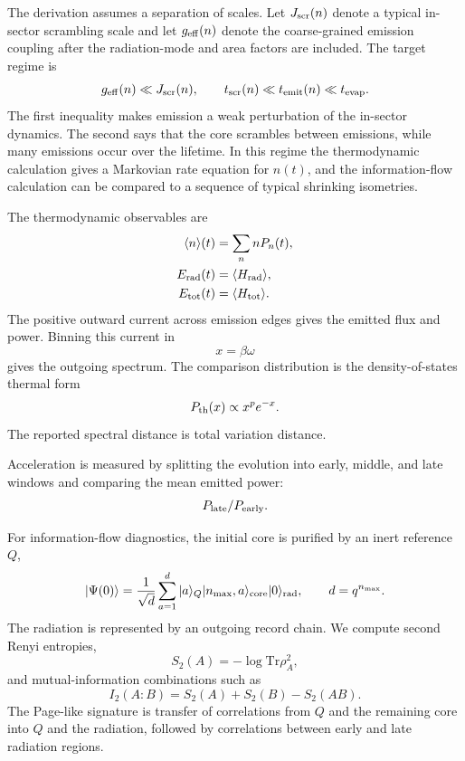 \documentclass[12pt]{article}
\newcommand{\Tr}{\mathrm{Tr}}
\newcommand{\ket}[1]{|#1\rangle}
\begin{document}
The derivation assumes a separation of scales.  Let $J_{\rm scr}(n)$ denote a
typical in-sector scrambling scale and let $g_{\rm eff}(n)$ denote the
coarse-grained emission coupling after the radiation-mode and area factors are
included.  The target regime is
\begin{equation}
    g_{\rm eff}(n)\ll J_{\rm scr}(n),
    \qquad
    t_{\rm scr}(n)\ll t_{\rm emit}(n)\ll t_{\rm evap}.
\end{equation}
The first inequality makes emission a weak perturbation of the in-sector
dynamics.  The second says that the core scrambles between emissions, while
many emissions occur over the lifetime.  In this regime the thermodynamic
calculation gives a Markovian rate equation for $n(t)$, and the
information-flow calculation can be compared to a sequence of typical
shrinking isometries.

The thermodynamic observables are
\begin{align}
    \langle n\rangle(t)&=\sum_n nP_n(t),\\
    E_{\rm rad}(t)&=\langle H_{\rm rad}\rangle,\\
    E_{\rm tot}(t)&=\langle H_{\rm tot}\rangle .
\end{align}
The positive outward current across emission edges gives the emitted flux and
power.  Binning this current in
\begin{equation}
    x=\beta\omega
\end{equation}
gives the outgoing spectrum.  The comparison distribution is the
density-of-states thermal form
\begin{equation}
    P_{\rm th}(x)\propto x^p e^{-x}.
\end{equation}
The reported spectral distance is total variation distance.

Acceleration is measured by splitting the evolution into early, middle, and
late windows and comparing the mean emitted power:
\begin{equation}
    P_{\rm late}/P_{\rm early}.
\end{equation}

For information-flow diagnostics, the initial core is purified by an inert
reference $Q$,
\begin{equation}
    \ket{\Psi(0)}
    =
    \frac{1}{\sqrt d}\sum_{a=1}^{d}
    \ket{a}_Q\ket{n_{\max},a}_{\rm core}\ket{0}_{\rm rad},
    \qquad d=q^{n_{\max}}.
\end{equation}
The radiation is represented by an outgoing record chain.  We compute second
Renyi entropies,
\begin{equation}
    S_2(A)=-\log\Tr\rho_A^2,
\end{equation}
and mutual-information combinations such as
\begin{equation}
    I_2(A:B)=S_2(A)+S_2(B)-S_2(AB).
\end{equation}
The Page-like signature is transfer of correlations from $Q$ and the remaining
core into $Q$ and the radiation, followed by correlations between early and
late radiation regions.
\end{document}
